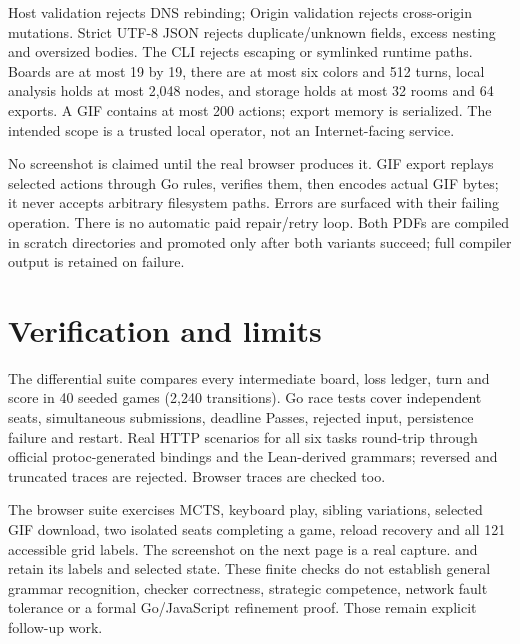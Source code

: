 \documentclass[11pt]{article}
\newcommand{\file}[1]{\path{#1}}
\begin{document}
Host validation rejects DNS rebinding; Origin validation rejects cross-origin
mutations. Strict UTF-8 JSON rejects duplicate/unknown fields, excess nesting
and oversized bodies. The CLI rejects escaping or symlinked runtime paths.
Boards are at most 19 by 19, there are at most six colors and 512 turns,
local analysis holds at most 2,048 nodes, and storage holds at most 32 rooms
and 64 exports. A GIF contains at most 200 actions; export memory is serialized.
The intended scope is a trusted local operator, not an Internet-facing service.

No screenshot is claimed until the real browser produces it. GIF export
replays selected actions through Go rules, verifies them, then encodes actual
GIF bytes; it never accepts arbitrary filesystem paths. Errors are surfaced
with their failing operation. There is no automatic paid repair/retry loop.
Both PDFs are compiled in scratch directories and promoted only after both
variants succeed; full compiler output is retained on failure.

\section*{Verification and limits}
The differential suite compares every intermediate board, loss ledger,
turn and score in 40 seeded games (2,240 transitions). Go race tests cover
independent seats, simultaneous submissions, deadline Passes, rejected input,
persistence failure and restart. Real HTTP scenarios for all six tasks round-trip
through official protoc-generated bindings and the Lean-derived grammars;
reversed and truncated traces are rejected. Browser traces are checked too.

The browser suite exercises MCTS, keyboard play, sibling variations, selected
GIF download, two isolated seats completing a game, reload recovery and all
121 accessible grid labels. The screenshot on the next page is a real capture.
\file{board-labels.txt} and \file{browser.json} retain its labels and selected
state. These finite checks do not establish general grammar recognition,
checker correctness, strategic competence, network fault tolerance or a formal
Go/JavaScript refinement proof. Those remain explicit follow-up work.

\clearpage
\end{document}
